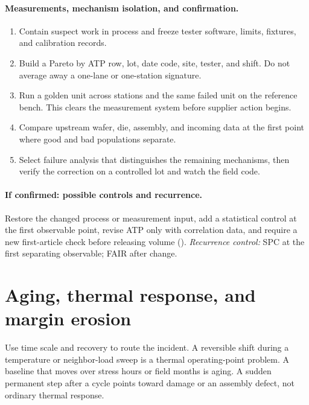 \paragraph{Measurements, mechanism isolation, and confirmation.}
\begin{enumerate}
\item Contain suspect work in process and freeze tester software, limits, fixtures,
      and calibration records.
\item Build a Pareto by ATP row, lot, date code, site, tester, and shift. Do not
      average away a one-lane or one-station signature.
\item Run a golden unit across stations and the same failed unit on the reference
      bench. This clears the measurement system before supplier action begins.
\item Compare upstream wafer, die, assembly, and incoming data at the first point
      where good and bad populations separate.
\item Select failure analysis that distinguishes the remaining mechanisms, then
      verify the correction on a controlled lot and watch the field code.
\end{enumerate}

\paragraph{If confirmed: possible controls and recurrence.}
Restore the changed process or measurement input, add a statistical control at the
first observable point, revise ATP only with correlation data, and require a new
first-article check before releasing volume ().
\emph{Recurrence control:} SPC at the first separating observable; FAIR after change.

\section{Aging, thermal response, and margin erosion}
\label{sec:fm-aging-thermal-router}

Use time scale and recovery to route the incident. A reversible shift during a
temperature or neighbor-load sweep is a thermal operating-point problem. A
baseline that moves over stress hours or field months is aging. A sudden
permanent step after a cycle points toward damage or an assembly defect, not
ordinary thermal response.

